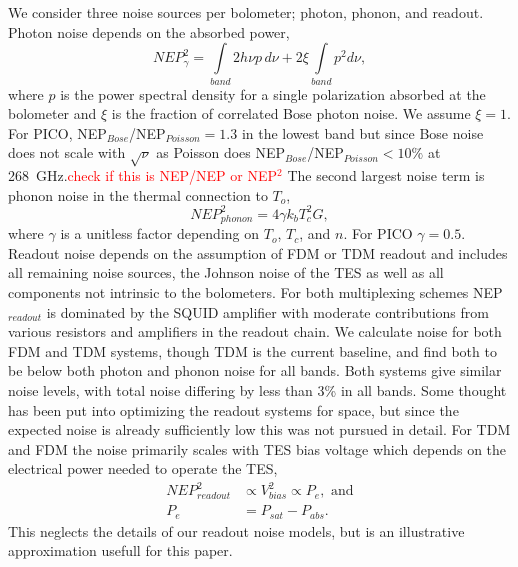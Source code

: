 \documentclass[]{spie}  %
\newcommand{\comr}[1]{\textcolor{red}{#1}}
\begin{document}
We consider three noise sources per bolometer; photon, phonon, and readout.  Photon noise depends on the absorbed power\cite{richards1994}, 
\begin{equation}
\label{eq:photon}
NEP_{\gamma}^2 = \int\limits_{band} 2h\nu p \, d\nu + 2\xi \int\limits_{band} p^2 d\nu,
\end{equation} 
where $p$ is the power spectral density for a single polarization absorbed at the bolometer and $\xi$ is the fraction of correlated Bose 
photon noise. We assume $\xi=1$. For PICO, NEP$_{Bose}$/NEP$_{Poisson}= 1.3 $ in the lowest band but since Bose noise does not scale with 
$\sqrt{\nu}$ as Poisson does NEP$_{Bose}$/NEP$_{Poisson} <10\%$ at 268~GHz.\comr{check if this is NEP/NEP or NEP$^2$} %
The second largest noise term is phonon noise\cite{mather1982} in the thermal connection to $T_o$,
\begin{equation}
\label{eq:phonon}
NEP_{phonon}^2 = 4 \gamma k_b T_c^2 G,
\end{equation} 
where $\gamma$ is a unitless factor depending on $T_o$, $T_c$, and $n$. For PICO $\gamma=0.5$.
Readout noise depends on the assumption of FDM or TDM readout and includes all remaining noise sources, the Johnson noise of the TES as well as 
all components not intrinsic to the bolometers.  
For both multiplexing schemes NEP$_{readout}$ is dominated by the SQUID amplifier with moderate contributions from various resistors 
and amplifiers in the readout chain. We calculate noise for both FDM and TDM systems, though TDM is the current baseline, and find both to 
be below both photon and phonon 
noise for all bands.  Both systems give similar noise levels, with total noise differing by less than 3\% in all bands.
Some thought has been put into optimizing the readout systems for space, but since the expected noise is already sufficiently low this was not pursued 
in detail. 
For TDM and FDM the noise primarily scales with TES bias voltage which depends on the electrical power needed to operate the TES, 
\begin{equation} 
\begin{split}
\label{eq:readout}
NEP_{readout}^2 &\propto V_{bias}^2 \propto  P_{e}, \text{ and}\\
P_{e} &= P_{sat} - P_{abs}.
\end{split}
\end{equation}
This neglects the details of our readout noise models, but is an illustrative approximation usefull for this paper.
\end{document}
